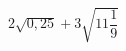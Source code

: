 \begin{ex}[type=calculate]
	\begin{condition}
		\( 2\sqrt{0,25}+3\sqrt{11\dfrac{1}{9}} \)
	\end{condition}
\end{ex}